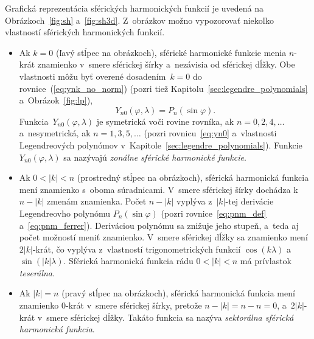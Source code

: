 \documentclass[a4paper, 12pt]{book}
\begin{document}
Grafická reprezentácia sférických harmonických funkcií je uvedená na 
Obrázkoch~\ref{fig:sh} a~\ref{fig:sh3d}.  Z~obrázkov možno vypozorovať niekoľko 
vlastností sférických harmonických funkcií.
%
\begin{itemize}
\item Ak $k = 0$ (ľavý stĺpec na obrázkoch), sférické harmonické funkcie menia 
$n$-krát znamienko v~smere sférickej šírky a~nezávisia od sférickej dĺžky.  Obe 
vlastnosti môžu byť overené dosadením~$k = 0$ do rovnice~(\ref{eq:ynk_no_norm}) 
(pozri tiež Kapitolu~\ref{sec:legendre_polynomials} a~Obrázok~\ref{fig:lp}),
%
\begin{equation}
\label{eq:yn0}
Y_{n0}(\varphi, \lambda) = P_n(\sin\varphi){.}
\end{equation}
%
Funkcia~$Y_{n0}(\varphi, \lambda)$ je symetrická voči rovine rovníka, ak $n 
= 0, 2, 4, \dots$ a~nesymetrická, ak $n = 1, 3, 5, \dots$ (pozri 
rovnicu~\ref{eq:yn0} a~vlastnosti Legendreových polynómov 
v~Kapitole~\ref{sec:legendre_polynomials}). Funkcie~$Y_{n0}(\varphi, \lambda)$ 
sa nazývajú \emph{zonálne sférické harmonické funkcie}.

\item Ak $0 < |k| < n$ (prostredný stĺpec na obrázkoch), sférická harmonická 
funkcia mení znamienko s~oboma súradnicami.  V~smere sférickej šírky dochádza 
k~$n - |k|$ zmenám znamienka.  Počet $n - |k|$ vyplýva z~$|k|$-tej derivácie 
Legendreovho polynómu $P_n(\sin\varphi)$ (pozri rovnice~\ref{eq:pnm_def} 
a~\ref{eq:pnm_ferrer}).  Deriváciou polynómu sa znižuje jeho stupeň, a~teda aj 
počet možností meniť znamienko.  V~smere sférickej dĺžky sa znamienko mení 
$2|k|$-krát, čo vyplýva z~vlastností trigonometrických funkcií $\cos(k\lambda)$ 
a~$\sin(|k|\lambda)$.  Sférická harmonická funkcia rádu $0 < |k| < n$ má 
prívlastok \emph{teserálna}.

\item Ak $|k| = n$ (pravý stĺpec na obrázkoch), sférická harmonická funkcia 
mení znamienko $0$-krát v~smere sférickej šírky, pretože $n - |k| = n - n = 0$, 
a~$2|k|$-krát v~smere sférickej dĺžky.  Takáto funkcia sa nazýva 
\emph{sektorálna sférická harmonická funkcia}.
\end{itemize}
\end{document}
